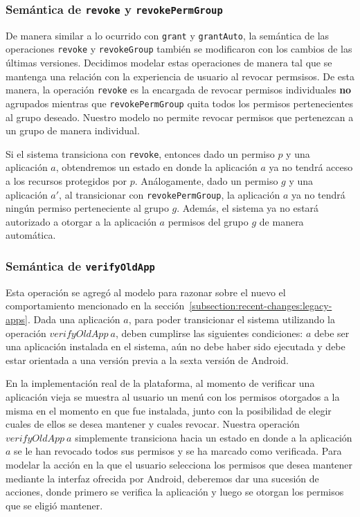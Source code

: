 \subsubsection{Semántica de \texttt{revoke} y \texttt{revokePermGroup}}

De manera similar a lo ocurrido con \texttt{grant} y \texttt{grantAuto}, la semántica de las
operaciones  \texttt{revoke} y \texttt{revokeGroup} también se modificaron con los cambios de las
últimas versiones. Decidimos modelar estas operaciones de manera tal que se mantenga una relación con
la experiencia de usuario al revocar permsisos. De esta manera, la operación \texttt{revoke} es la
encargada de revocar permisos individuales \textbf{no} agrupados mientras que \texttt{revokePermGroup}
quita todos los permisos pertenecientes al grupo deseado. Nuestro modelo no permite revocar permisos
que pertenezcan a un grupo de manera individual.

Si el sistema transiciona con \texttt{revoke}, entonces dado un permiso $p$ y una aplicación $a$,
obtendremos un estado en donde la aplicación $a$ ya no tendrá acceso a los recursos protegidos por
$p$. Análogamente, dado un permiso $g$ y una aplicación $a'$, al transicionar con
\texttt{revokePermGroup}, la aplicación $a$ ya no tendrá ningún permiso perteneciente al grupo $g$.
Además, el sistema ya no estará autorizado a otorgar a la aplicación $a$ permisos del grupo $g$ de
manera automática.


\subsubsection{Semántica de \texttt{verifyOldApp}}

Esta operación se agregó al modelo para razonar sobre el nuevo el comportamiento mencionado en la
sección~\ref{subsection:recent-changes:legacy-apps}. Dada una aplicación $a$, para poder transicionar
el sistema utilizando la operación $verifyOldApp\ a$, deben cumplirse las siguientes condiciones: $a$
debe ser una aplicación instalada en el sistema, aún no debe haber sido ejecutada y debe estar
orientada a una versión previa a la sexta versión de Android.

En la implementación real de la plataforma, al momento de verificar una aplicación vieja se muestra al
usuario un menú con los permisos otorgados a la misma en el momento en que fue instalada, junto
con la posibilidad de elegir cuales de ellos se desea mantener y cuales revocar. Nuestra operación
$verifyOldApp\ a$ simplemente transiciona hacia un estado en donde a la aplicación $a$ se le han
revocado todos sus permisos y se ha marcado como verificada. Para modelar la acción en la que el
usuario selecciona los permisos que desea mantener mediante la interfaz ofrecida por Android,
deberemos dar una sucesión de acciones,  donde primero se verifica la aplicación y luego se otorgan
los permisos que se eligió mantener.

